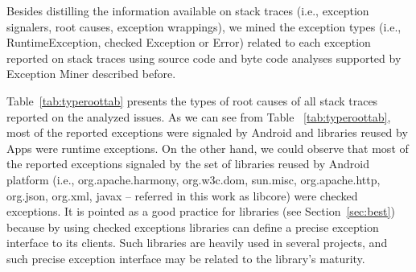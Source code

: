 \documentclass[conference]{IEEEtran}
\begin{document}
Besides distilling the information available on stack traces (i.e., exception signalers, root causes, exception wrappings),
we mined the exception types (i.e., RuntimeException, checked Exception or Error) related to each exception reported on stack traces 
using source code and byte code analyses supported by Exception Miner described before. 

 Table~\ref{tab:typeroottab} presents the types of root causes of all stack traces reported on the analyzed issues. As we can see 
from Table ~\ref{tab:typeroottab},  most of the reported exceptions were signaled by Android and libraries reused by Apps were runtime exceptions. 
On the other hand, we could observe that most of the reported exceptions signaled by the set of 
libraries reused by Android platform (i.e., org.apache.harmony,
org.w3c.dom, sun.misc, org.apache.http, org.json, org.xml, javax -- referred in
this work as libcore) were checked exceptions. It is pointed as a good practice
for libraries (see Section~\ref{sec:best}) because by using checked exceptions
libraries can define a precise exception interface to its clients. Such
libraries are heavily used in several projects, and such precise exception
interface may be related to the library's maturity.





\end{document}
